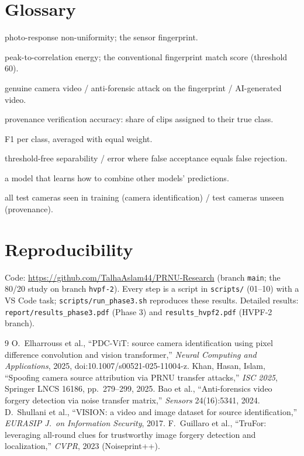 \documentclass[11pt,a4paper]{article}
\begin{document}
\section{Glossary}
\begin{description}[leftmargin=0pt, itemsep=1pt]
\item[PRNU] photo-response non-uniformity; the sensor fingerprint.
\item[PCE / PCE$_0$] peak-to-correlation energy; the conventional fingerprint match score (threshold 60).
\item[Organic / manipulated / synthetic] genuine camera video / anti-forensic attack on the fingerprint / AI-generated video.
\item[PVA] provenance verification accuracy: share of clips assigned to their true class.
\item[Macro F1] F1 per class, averaged with equal weight.
\item[AUC / EER] threshold-free separability / error where false acceptance equals false rejection.
\item[Stacking] a model that learns how to combine other models' predictions.
\item[Closed set / open set] all test cameras seen in training (camera identification) / test cameras unseen (provenance).
\end{description}

\section{Reproducibility}
Code: \url{https://github.com/TalhaAslam44/PRNU-Research} (branch \texttt{main}; the 80/20 study on branch \texttt{hvpf-2}).
Every step is a script in \texttt{scripts/} (01--10) with a VS Code task; \texttt{scripts/run\_phase3.sh} reproduces these
results. Detailed results: \texttt{report/results\_phase3.pdf} (Phase 3) and \texttt{results\_hvpf2.pdf} (HVPF-2 branch).

\begin{thebibliography}{9}
 O.~Elharrouss et al., ``PDC-ViT: source camera identification using pixel difference convolution and vision
  transformer,'' \emph{Neural Computing and Applications}, 2025, doi:10.1007/s00521-025-11004-z.
 Khan, Hasan, Islam, ``Spoofing camera source attribution via PRNU transfer attacks,'' \emph{ISC 2025},
  Springer LNCS 16186, pp.~279--299, 2025.
 Bao et al., ``Anti-forensics video forgery detection via noise transfer matrix,'' \emph{Sensors} 24(16):5341, 2024.
 D.~Shullani et al., ``VISION: a video and image dataset for source identification,'' \emph{EURASIP J.\ on
  Information Security}, 2017.
 F.~Guillaro et al., ``TruFor: leveraging all-round clues for trustworthy image forgery detection and
  localization,'' \emph{CVPR}, 2023 (Noiseprint++).
\end{thebibliography}
\end{document}
